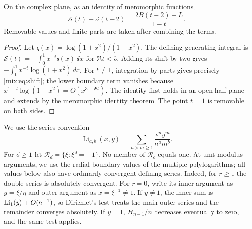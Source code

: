 \begin{theorem}\label{mix:thm:shift}
On the complex plane, as an identity of meromorphic functions,
\begin{equation}\label{mix:eq:shift}
 \boxed{\quad
 \mathcal S(t)+\mathcal S(t-2)
       =\frac{2B(t-2)-L}{1-t}.
 \quad}
\end{equation}
Removable values and finite parts are taken after combining the terms.
\end{theorem}
\begin{proof}
Let $q(x)=\log(1+x^2)/(1+x^2)$. The defining generating integral is
$\mathcal S(t)=-\int_0^1x^{-t}q(x)\,dx$ for $\Re t<3$.
Adding its shift by two gives
$-\int_0^1x^{-t}\log(1+x^2)\,dx$.
For $t\ne1$, integration by parts gives precisely
\eqref{mix:eq:shift}; the lower boundary term vanishes because
$x^{1-t}\log(1+x^2)=O(x^{3-\Re t})$.
The identity first holds in an open half-plane and extends by the
meromorphic identity theorem. The point $t=1$ is removable on both sides.
\end{proof}

We use the series convention
\[
 \operatorname{Li}_{a,b}(x,y)
 =\sum_{n>m\ge1}\frac{x^ny^m}{n^am^b}.
\]
For $d\ge1$ let $\mathcal R_d=\{\xi:\xi^d=-1\}$.
No member of $\mathcal R_d$ equals one. At unit-modulus arguments,
we use the radial boundary values of the multiple polylogarithms; all
values below also have ordinarily convergent defining series.
Indeed, for $r\ge1$ the double series is absolutely convergent.
For $r=0$, write its inner argument as $y=\xi/\eta$ and outer
argument as $x=\xi^{-1}\ne1$. If $y\ne1$, the inner sum is
$\operatorname{Li}_1(y)+O(n^{-1})$, so Dirichlet's test treats the main outer
series and the remainder converges absolutely. If $y=1$,
$H_{n-1}/n$ decreases eventually to zero, and the same test applies.

